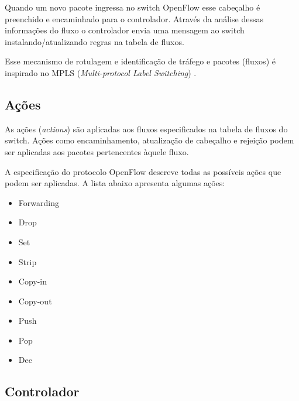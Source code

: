 Quando um novo pacote ingressa no switch OpenFlow esse cabeçalho é preenchido
e encaminhado para o controlador. 
Através da análise dessas informações do fluxo o controlador envia uma 
mensagem ao switch instalando/atualizando regras na tabela de fluxos. 

Esse mecanismo de rotulagem e identificação de tráfego e pacotes (fluxos) é
inspirado no MPLS (\emph{Multi-protocol Label Switching}) 
\citep{bruce2008mpls}.

\subsection{Ações}

As ações (\emph{actions}) são aplicadas aos fluxos especificados na tabela
de fluxos do switch.
Ações como encaminhamento, atualização de cabeçalho e rejeição podem ser 
aplicadas aos pacotes pertencentes àquele fluxo.

A especificação do protocolo OpenFlow \citep{ofprotocol2015} descreve todas 
as possíveis ações que podem ser aplicadas.
A lista abaixo apresenta algumas ações:

\begin{multicols}{3}
    \begin{itemize}
        \item Forwarding
        \item Drop
        \item Set
        \item Strip
        \item Copy-in
        \item Copy-out
        \item Push
        \item Pop
        \item Dec
    \end{itemize}
\end{multicols}

\subsection{Controlador}
